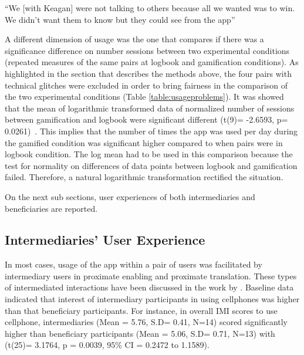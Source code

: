  {``We [with Keagan] were not talking to others because all we wanted was to win. We didn't want them to know but they could see from the app''}

A different dimension of usage was the one that compares if there was a significance difference on number sessions between two experimental conditions (repeated measures of the same pairs at logbook and gamification conditions). As highlighted in the section that describes the methods above, the four pairs with technical glitches were excluded in order to bring fairness in the comparison of the two experimental conditions (Table \ref{table:usageproblems}). It was showed that the mean of logarithmic transformed data of normalized number of sessions between gamification and logbook were significant different (t(9)= -2.6593, p= 0.0261)~\citep{katule2016family}. This implies that the number of times the app was used per day during the gamified condition was significant higher compared to when pairs were in logbook condition. The log mean had to be used in this comparison because the test for normality on differences of data points between logbook and gamification failed. Therefore, a natural logarithmic transformation rectified the situation.

On the next sub sections, user experiences of both intermediaries and beneficiaries are reported.
\subsection{Intermediaries' User Experience}
In most cases, usage of the app within a pair of users was facilitated by intermediary users in proximate enabling and proximate translation. These types of intermediated interactions have been discussed in the work by \cite{sambasivan2010}. Baseline data indicated that interest of intermediary participants in using cellphones was higher than that beneficiary participants. For instance, in overall IMI scores to use cellphone, intermediaries (Mean = 5.76, S.D= 0.41, N=14) scored  significantly higher than beneficiary participants (Mean = 5.06, S.D= 0.71, N=13) with (t(25)= 3.1764, p = 0.0039, 95\% CI = 0.2472 to 1.1589).

